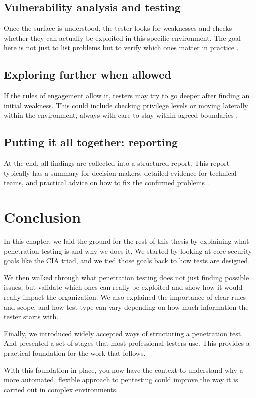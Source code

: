 \subsection{Vulnerability analysis and testing}
\label{subsubsec:ch1-method-exploit}

Once the surface is understood, the tester looks for weaknesses and checks whether they can actually be exploited in this specific environment. The goal here is not just to list problems but to verify which ones matter in practice \cite{nistSP800115,ptes}.

\subsection{Exploring further when allowed}
\label{subsubsec:ch1-method-post}

If the rules of engagement allow it, testers may try to go deeper after finding an initial weakness. This could include checking privilege levels or moving laterally within the environment, always with care to stay within agreed boundaries \cite{ptes}.

\subsection{Putting it all together: reporting}
\label{subsubsec:ch1-method-report}

At the end, all findings are collected into a structured report. This report typically has a summary for decision-makers, detailed evidence for technical teams, and practical advice on how to fix the confirmed problems \cite{nistSP800115,ptes}.

\section{Conclusion}
\label{subsec:ch1-conclusion}

In this chapter, we laid the ground for the rest of this thesis by explaining what penetration testing is and why we does it. We started by looking at core security goals like the CIA triad, and we tied those goals back to how tests are designed.

We then walked through what penetration testing does not just finding possible issues, but validate which ones can really be exploited and show how it would really impact the organization. We also explained the importance of clear rules and scope, and how test type can vary depending on how much information the tester starts with.

Finally, we introduced widely accepted ways of structuring a penetration test. And presented a set of stages that most professional testers use. This provides a practical foundation for the work that follows.

With this foundation in place, you now have the context to understand why a more automated, flexible approach to pentesting could improve the way it is carried out in complex environments.